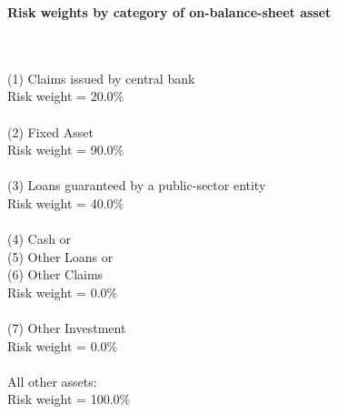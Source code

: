 \documentclass{article}
\begin{document}
\setlength{\parindent}{0em}
\begin{center}{\bf Risk weights by category of on-balance-sheet asset}\end{center}
~\\
~\\

(1) Claims issued by central bank \\
Risk weight = 20.0\%\\

~\\
(2) Fixed Asset\\
Risk weight = 90.0\%\\

~\\
(3) Loans guaranteed by a public-sector entity \\
Risk weight = 40.0\%\\

~\\
(4) Cash or \\
(5) Other Loans or \\
(6) Other Claims\\
Risk weight = 0.0\%\\

~\\
(7) Other Investment\\
Risk weight = 0.0\%\\

~\\
All other assets:\\
Risk weight = 100.0\%\\

~\\
\end{document}
